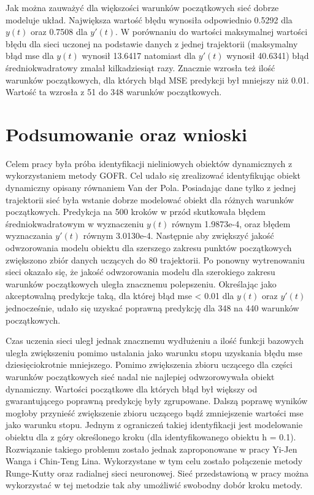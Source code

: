 Jak można zauważyć dla większości warunków początkowych sieć dobrze modeluje układ. Największa wartość błędu wynosiła odpowiednio 0.5292 dla $y(t)$ oraz 0.7508 dla $y'(t)$. W porównaniu do wartości maksymalnej wartości błędu dla sieci uczonej na podstawie danych z jednej trajektorii (maksymalny błąd mse dla $y(t)$ wynosił 13.6417 natomiast dla $y'(t)$ wynosił 40.6341) błąd średniokwadratowy zmalał kilkadziesiąt razy. Znacznie wzrosła też ilość warunków początkowych, dla których błąd MSE predykcji był mniejszy niż 0.01. Wartość ta wzrosła z 51 do 348 warunków początkowych.

\clearpage
\section{Podsumowanie oraz wnioski}

Celem pracy była próba identyfikacji nieliniowych obiektów dynamicznych z wykorzystaniem metody GOFR. Cel udało się zrealizować identyfikując obiekt dynamiczny opisany równaniem Van der Pola. Posiadając dane tylko z jednej trajektorii sieć była wstanie dobrze modelować obiekt dla różnych warunków początkowych. Predykcja na 500 kroków w przód skutkowała błędem średniokwadratowym w wyznaczeniu $y(t)$ równym 1.9873e-4, oraz błędem wyznaczania $y'(t)$ równym 3.0130e-4. Następnie aby zwiększyć jakość odwzorowania modelu obiektu dla szerszego zakresu punktów początkowych zwiększono zbiór danych uczących do 80 trajektorii. Po ponowny wytrenowaniu sieci okazało się, że jakość odwzorowania modelu dla szerokiego zakresu warunków początkowych uległa znacznemu polepszeniu.
Określając jako akceptowalną predykcje taką, dla której błąd mse < 0.01 dla $y(t)$ oraz $y'(t)$ jednocześnie, udało się uzyskać poprawną predykcję dla 348 na 440 warunków początkowych.

Czas uczenia sieci uległ jednak znacznemu wydłużeniu a ilość funkcji bazowych uległa zwiększeniu pomimo ustalania jako warunku stopu uzyskania błędu mse dziesięciokrotnie mniejszego. Pomimo zwiększenia zbioru uczącego dla części warunków początkowych sieć nadal nie najlepiej odwzorowywała obiekt dynamiczny.  Wartości początkowe dla których błąd był większy od gwarantującego poprawną predykcję były zgrupowane. Dalszą poprawę wyników mogłoby przynieść zwiększenie zbioru uczącego bądź zmniejszenie wartości mse jako warunku stopu. Jednym z ograniczeń takiej identyfikacji jest modelowanie obiektu dla z góry określonego kroku (dla identyfikowanego obiektu h = 0.1). Rozwiązanie takiego problemu zostało jednak zaproponowane w pracy Yi-Jen Wanga i Chin-Teng Lina\cite{Wang}. Wykorzystane w tym celu zostało połączenie metody Runge-Kutty oraz radialnej sieci neuronowej. Sieć przedstawioną w pracy można wykorzystać w tej metodzie tak aby umożliwić swobodny dobór kroku metody.

